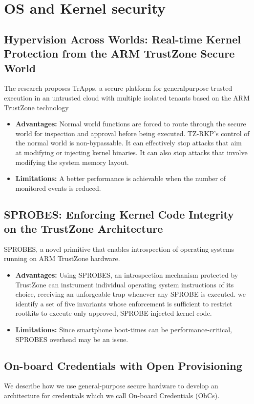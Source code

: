 \documentclass[conference]{IEEEtran}
\begin{document}
\section{OS and Kernel security}

\subsection{Hypervision Across Worlds: Real-time Kernel Protection from the ARM TrustZone Secure World}
The research proposes TrApps, a secure platform for generalpurpose trusted execution in an untrusted cloud with multiple isolated tenants based on the ARM TrustZone technology

\begin{itemize}
    \item \textbf{Advantages:} Normal world functions are forced to route through the secure world for inspection and approval before being executed. TZ-RKP’s control of the normal world is non-bypassable. It can effectively stop attacks that aim at modifying or injecting kernel binaries. It can also stop attacks that involve modifying the system memory layout.
    \item \textbf{Limitations:} A better performance is achievable when the number of monitored events is reduced.
\end{itemize}


\subsection{SPROBES: Enforcing Kernel Code Integrity on the TrustZone Architecture}
SPROBES, a novel primitive that enables introspection of operating systems running on ARM TrustZone hardware.

\begin{itemize}
    \item \textbf{Advantages:} Using SPROBES, an introspection mechanism protected by TrustZone can instrument individual operating system instructions of its choice, receiving an unforgeable trap whenever any SPROBE is executed. we identify a set of five invariants whose enforcement is sufficient to restrict rootkits to execute only approved, SPROBE-injected kernel code.
    \item \textbf{Limitations:} Since smartphone boot-times can be performance-critical, SPROBES overhead may be an issue.
\end{itemize}


\subsection{On-board Credentials with Open Provisioning}
We describe how we use general-purpose secure hardware to develop an architecture for credentials which we call On-board Credentials (ObCs).
\end{document}
